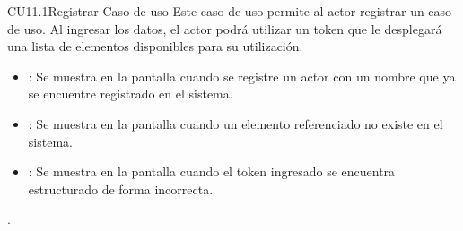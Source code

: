 \begin{UseCase}{CU11.1}{Registrar Caso de uso}{
			Este caso de uso permite al actor registrar un caso de uso. Al ingresar los datos, el actor podrá utilizar un token que le desplegará una lista de elementos disponibles para su utilización.
	}
{\begin{itemize}
		\item {}: Se muestra en la pantalla  cuando se registre un actor con un nombre que ya se encuentre registrado en el sistema.
		\item {}: Se muestra en la pantalla  cuando un elemento referenciado no existe en el sistema.
		\item {}: Se muestra en la pantalla  cuando el token ingresado se encuentra estructurado de forma incorrecta.
		\end{itemize}.
		}
	\end{UseCase}

